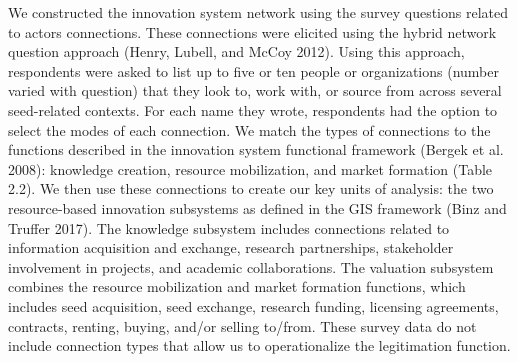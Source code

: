 \documentclass[twoside,12pt,final]{ucthesis-CA2012}
\begin{document}
\begin{ucmainmatter}
We constructed the innovation system network using the survey questions
related to actors\textquotesingle{} connections. These connections were elicited using
the \textquotesingle hybrid\textquotesingle{} network question approach (Henry, Lubell, and McCoy
2012). Using this approach,
respondents were asked to list up to five or ten people or organizations
(number varied with question) that they look to, work with, or source
from across several seed-related contexts. For each name they wrote,
respondents had the option to select the modes of each connection. We
match the types of connections to the functions described in the
innovation system functional framework (Bergek et al.
2008): knowledge creation,
resource mobilization, and market formation (Table 2.2). We then use
these connections to create our key units of analysis: the two
resource-based innovation subsystems as defined in the GIS framework
(Binz and Truffer 2017).
The knowledge subsystem includes connections related to information
acquisition and exchange, research partnerships, stakeholder involvement
in projects, and academic collaborations. The valuation subsystem
combines the resource mobilization and market formation functions, which
includes seed acquisition, seed exchange, research funding, licensing
agreements, contracts, renting, buying, and/or selling to/from. These
survey data do not include connection types that allow us to
operationalize the legitimation function.
\begin{table}


\end{table}
\end{ucmainmatter}
\end{document}

